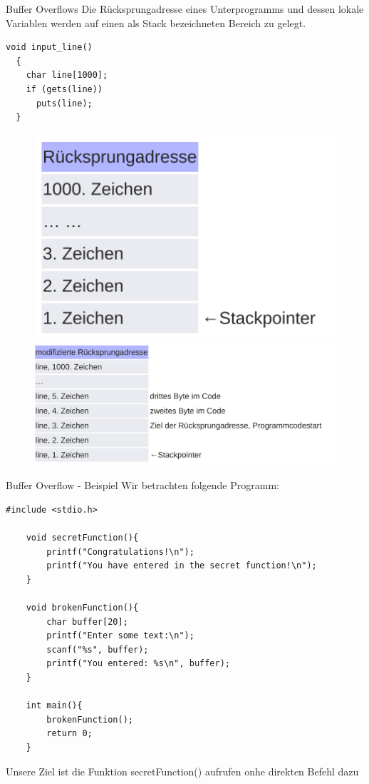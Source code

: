 \documentclass[10pt]{beamer}
\begin{document}
\begin{frame}[fragile]{Buffer Overflows}
 Die R\"ucksprungadresse eines Unterprogramms und dessen lokale Variablen werden auf einen als Stack bezeichneten Bereich zu gelegt.
 \begin{lstlisting}[style=CStyle]
  void input_line()
  {
    char line[1000];
    if (gets(line))
      puts(line);
  }
 \end{lstlisting}

 \begin{figure}%
  \centering
  {\includegraphics[scale=0.10]{stackoverflow}}%
  \quad
  {\includegraphics[scale=0.10]{stackoverflow_2}}%
 \end{figure}
\end{frame}

\begin{frame}[fragile]{Buffer Overflow - Beispiel}
  Wir betrachten folgende Programm:
  \begin{lstlisting}[style=C2Style]
    #include <stdio.h>

    void secretFunction(){
        printf("Congratulations!\n");
        printf("You have entered in the secret function!\n");
    }

    void brokenFunction(){
        char buffer[20];
        printf("Enter some text:\n");
        scanf("%s", buffer);
        printf("You entered: %s\n", buffer);
    }

    int main(){
        brokenFunction();
        return 0;
    }

  \end{lstlisting}
  Unsere Ziel ist die Funktion secretFunction() aufrufen onhe direkten Befehl dazu
\end{frame}
\end{document}
